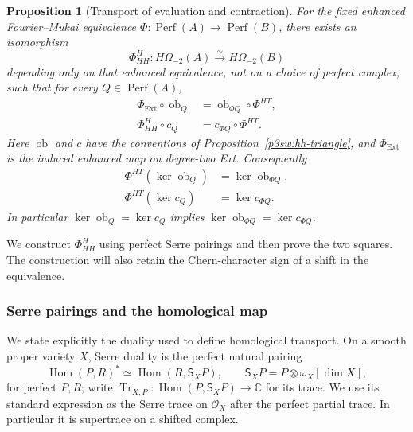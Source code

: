 \documentclass[11pt]{article}
\newtheorem{proposition}[theorem]{Proposition}
\numberwithin{equation}{section}
\begin{document}
\begin{proposition}[Transport of evaluation and contraction]
\label{p3sw:hh-transport}
For the fixed enhanced Fourier--Mukai equivalence
\(\Phi:\operatorname{Perf}(A)\to\operatorname{Perf}(B)\), there exists an
isomorphism
\[
 \Phi^H_{HH}:H\Omega_{-2}(A)\xrightarrow{\sim}H\Omega_{-2}(B)
\]
depending only on that enhanced equivalence, not on a choice of perfect
complex, such that for every \(Q\in\operatorname{Perf}(A)\),
\begin{equation}
\begin{split}
 \Phi_{\mathrm{Ext}}\circ\operatorname{ob}_Q
     &=\operatorname{ob}_{\Phi Q}\circ\Phi^{HT},\\
 \Phi^H_{HH}\circ c_Q&=c_{\Phi Q}\circ\Phi^{HT}.
\end{split}
\label{p3sw:hh-eq:transport-squares}
\end{equation}
Here \(\operatorname{ob}\) and \(c\) have the conventions of
Proposition~\ref{p3sw:hh-triangle}, and \(\Phi_{\mathrm{Ext}}\) is the
induced enhanced map on degree-two Ext.  Consequently
\begin{equation}
\begin{split}
 \Phi^{HT}(\ker\operatorname{ob}_Q)
       &=\ker\operatorname{ob}_{\Phi Q},\\
 \Phi^{HT}(\ker c_Q)&=\ker c_{\Phi Q}.
\end{split}
\label{p3sw:hh-eq:kernel-transport}
\end{equation}
In particular \(\ker\operatorname{ob}_Q=\ker c_Q\) implies
\(\ker\operatorname{ob}_{\Phi Q}=\ker c_{\Phi Q}\).
\end{proposition}

We construct \(\Phi^H_{HH}\) using perfect Serre pairings and then
prove the two squares.  The construction will also retain the
Chern-character sign of a shift in the equivalence.

\subsubsection{Serre pairings and the homological map}

We state explicitly the duality used to define homological
transport.  On a smooth proper variety \(X\), Serre duality is the
perfect natural pairing
\[
 \operatorname{Hom}(P,R)^*
      \simeq\operatorname{Hom}(R,\mathsf S_XP),\qquad
 \mathsf S_XP=P\otimes\omega_X[\dim X],
\]
for perfect \(P,R\); write
\(\operatorname{Tr}_{X,P}:\operatorname{Hom}(P,\mathsf S_XP)
\to\mathbb C\) for its trace.  We use its standard expression as
the Serre trace on \(\mathcal O_X\) after the perfect partial trace.
In particular it is supertrace on a shifted complex.
\end{document}
